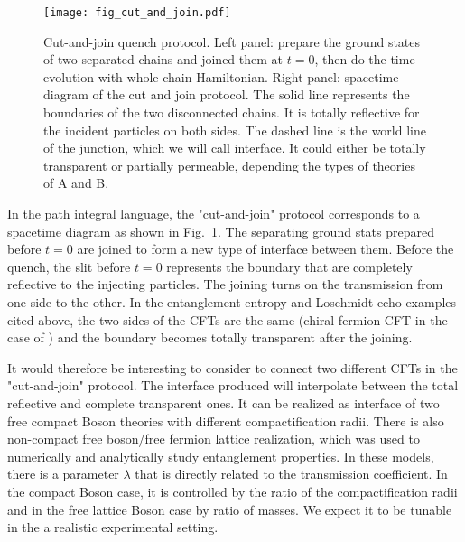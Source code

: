 \begin{figure}[h]
\texttt{[image: fig\_cut\_and\_join.pdf]}
\caption{Cut-and-join quench protocol. Left panel: prepare the ground states of two separated chains and joined them at $t = 0$, then do the time evolution with whole chain Hamiltonian. Right panel: spacetime diagram of the cut and join protocol. The solid line represents the boundaries of the two disconnected chains. It is totally reflective for the incident particles on both sides. The dashed line is the world line of the junction, which we will call interface. It could either be totally transparent or partially permeable, depending the types of theories of A and B.}
\label{fig:cut-and-join}
\end{figure}

In the path integral language, the "cut-and-join" protocol corresponds to a spacetime diagram as shown in Fig.~\ref{fig:cut-and-join}. The separating ground stats prepared before $t = 0$ are joined to form a new type of interface between them. Before the quench, the slit before $t = 0$ represents the boundary that are completely reflective to the injecting particles. The joining turns on the transmission from one side to the other. In the entanglement entropy and Loschmidt echo examples cited above\cite{calabrese_entanglement_2007, calabrese_quantum_2016, vasseur_universal_2014}, the two sides of the CFTs are the same (chiral fermion CFT in the case of ) and the boundary becomes totally transparent after the joining. 

It would therefore be interesting to consider to connect two different CFTs in the "cut-and-join" protocol. The interface produced will interpolate between the total reflective and complete transparent ones. It can be realized as interface of two free compact Boson theories with different compactification radii\cite{bachas_permeable_2002}. There is also non-compact free boson/free fermion lattice realization, which was used to numerically and analytically\cite{peschel_exact_2012,sakai_entanglement_2008} study entanglement properties. In these models, there is a parameter $\lambda$ that is directly related to the transmission coefficient. In the compact Boson case, it is controlled by the ratio of the compactification radii and in the free lattice Boson case by ratio of masses. We expect it to be tunable in the a realistic experimental setting.


